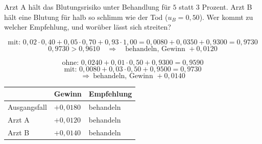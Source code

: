 \begin{aufgabe}
Arzt A hält das Blutungsrisiko unter Behandlung für $5$ statt $3$ Prozent. Arzt B hält eine Blutung für halb so schlimm wie der Tod ($u_B = 0{,}50$). Wer kommt zu welcher Empfehlung, und worüber lässt sich streiten?

\loesung
{}
\[ \text{mit: } 0{,}02\cdot0{,}40 + 0{,}05\cdot0{,}70 + 0{,}93\cdot1{,}00 = 0{,}0080+0{,}0350+0{,}9300 = 0{,}9730 \]
\[ 0{,}9730 > 0{,}9610 \quad\Longrightarrow\quad \text{behandeln, Gewinn } +0{,}0120 \]

\[ \text{ohne: } 0{,}0240 + 0{,}01\cdot0{,}50 + 0{,}9300 = 0{,}9590 \]
\[ \text{mit: } 0{,}0080 + 0{,}03\cdot0{,}50 + 0{,}9500 = 0{,}9730 \]
\[ \Longrightarrow\ \text{behandeln, Gewinn } +0{,}0140 \]

\begin{center}
{\small
\renewcommand{\arraystretch}{1.48}
\begin{tabular}{@{}P{2.6cm}P{2.4cm}P{2.4cm}@{}}
\toprule
& \textbf{Gewinn} & \textbf{Empfehlung}\\
\midrule
Ausgangsfall & $+0{,}0180$ & behandeln\\
Arzt A & $+0{,}0120$ & behandeln\\
Arzt B & $+0{,}0140$ & behandeln\\
\bottomrule
\end{tabular}}
\end{center}

\begin{center}
\begin{minipage}{0.88\textwidth}
\end{minipage}
\end{center}
\end{aufgabe}

